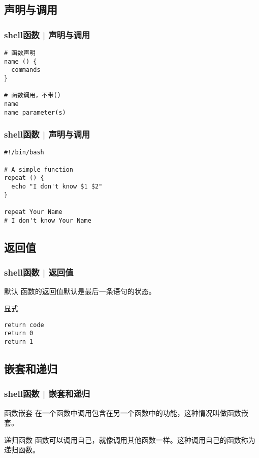 \subsection{声明与调用}
\begin{frame}[fragile]
  \frametitle{shell函数 | \alert{声明与调用}}
\begin{lstlisting}
# 函数声明
name () {
  commands
}

# 函数调用，不带()
name
name parameter(s)
\end{lstlisting}
\end{frame}

\begin{frame}[fragile]
  \frametitle{shell函数 | 声明与调用}
\begin{lstlisting}
#!/bin/bash

# A simple function
repeat () {
  echo "I don't know $1 $2"
}

repeat Your Name
# I don't know Your Name
\end{lstlisting}
\end{frame}

\subsection{返回值}
\begin{frame}[fragile]
  \frametitle{shell函数 | \alert{返回值}}
  \begin{block}{默认}
    函数的返回值默认是最后一条语句的状态。
  \end{block}
  \pause
  \begin{block}{显式}
\begin{lstlisting}
return code
return 0
return 1
\end{lstlisting}
  \end{block}
\end{frame}

\subsection{嵌套和递归}
\begin{frame}[fragile]
  \frametitle{shell函数 | 嵌套和递归}
  \begin{block}{函数嵌套}
  在一个函数中调用包含在另一个函数中的功能，这种情况叫做函数嵌套。
  \end{block}
  \pause
  \begin{block}{递归函数}
  函数可以调用自己，就像调用其他函数一样。这种调用自己的函数称为递归函数。
  \end{block}
\end{frame}

